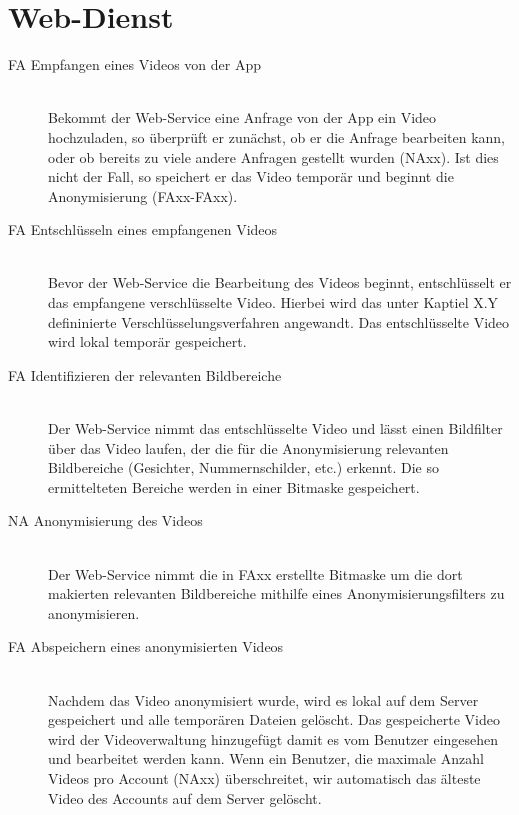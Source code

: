\section{Web-Dienst}
\begin{description}
\item[FA Empfangen eines Videos von der App] \hfill \\
Bekommt der Web-Service eine Anfrage von der App ein Video hochzuladen, so überprüft er zunächst, ob er die Anfrage bearbeiten kann, oder ob bereits zu viele andere Anfragen gestellt wurden (NAxx). Ist dies nicht der Fall, so speichert er das Video temporär und beginnt die Anonymisierung (FAxx-FAxx).

\item[FA Entschlüsseln eines empfangenen Videos] \hfill \\
Bevor der Web-Service die Bearbeitung des Videos beginnt, entschlüsselt er das empfangene verschlüsselte Video. Hierbei wird das unter Kaptiel X.Y defininierte Verschlüsselungsverfahren angewandt. Das entschlüsselte Video wird lokal temporär gespeichert.

\item[FA Identifizieren der relevanten Bildbereiche] \hfill \\
Der Web-Service nimmt das entschlüsselte Video und lässt einen Bildfilter über das Video laufen, der die für die Anonymisierung relevanten Bildbereiche (Gesichter, Nummernschilder, etc.) erkennt. Die so ermittelteten Bereiche werden in einer Bitmaske gespeichert.

\item[NA Anonymisierung des Videos] \hfill \\
Der Web-Service nimmt die in FAxx erstellte Bitmaske um die dort makierten relevanten Bildbereiche mithilfe eines Anonymisierungsfilters zu anonymisieren.

\item[FA Abspeichern eines anonymisierten Videos] \hfill \\
Nachdem das Video anonymisiert wurde, wird es lokal auf dem Server gespeichert und alle temporären Dateien gelöscht. Das gespeicherte Video wird der Videoverwaltung hinzugefügt damit es vom Benutzer eingesehen und bearbeitet werden kann. Wenn ein Benutzer, die maximale Anzahl Videos pro Account (NAxx) überschreitet, wir automatisch das älteste Video des Accounts auf dem Server gelöscht.
\end{description}

